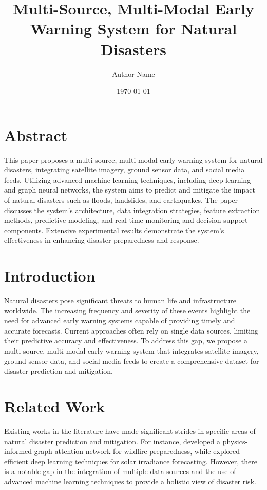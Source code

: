 \documentclass{article}
\title{Multi-Source, Multi-Modal Early Warning System for Natural Disasters}
\author{Author Name}
\date{\today}
\begin{document}
\maketitle

\section{Abstract}
This paper proposes a multi-source, multi-modal early warning system for natural disasters, integrating satellite imagery, ground sensor data, and social media feeds. Utilizing advanced machine learning techniques, including deep learning and graph neural networks, the system aims to predict and mitigate the impact of natural disasters such as floods, landslides, and earthquakes. The paper discusses the system's architecture, data integration strategies, feature extraction methods, predictive modeling, and real-time monitoring and decision support components. Extensive experimental results demonstrate the system's effectiveness in enhancing disaster preparedness and response.

\section{Introduction}
Natural disasters pose significant threats to human life and infrastructure worldwide. The increasing frequency and severity of these events highlight the need for advanced early warning systems capable of providing timely and accurate forecasts. Current approaches often rely on single data sources, limiting their predictive accuracy and effectiveness. To address this gap, we propose a multi-source, multi-modal early warning system that integrates satellite imagery, ground sensor data, and social media feeds to create a comprehensive dataset for disaster prediction and mitigation.

\section{Related Work}
Existing works in the literature have made significant strides in specific areas of natural disaster prediction and mitigation. For instance, \cite{esparza2025graphfirex} developed a physics-informed graph attention network for wildfire preparedness, while \cite{hoang2025efficientdeeplearningshortterm} explored efficient deep learning techniques for solar irradiance forecasting. However, there is a notable gap in the integration of multiple data sources and the use of advanced machine learning techniques to provide a holistic view of disaster risk.
\end{document}
